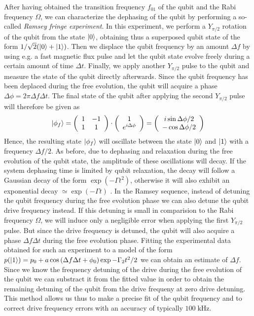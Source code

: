After having obtained the transition frequency $f_{01}$ of the qubit and the Rabi frequency $\Omega$, we can characterize the dephasing of the qubit by performing a so-called {\it Ramsey fringe experiment}\citep{}. In this experiment, we perform a $Y_{\pi/2}$ rotation of the qubit from the state $\left| 0 \right>$, obtaining thus a superposed qubit state of the form $1/\sqrt{2}(\left| 0 \right>+\left| 1 \right>)$. Then we displace the qubit frequency by an amount $\Delta f$ by using e.g. a fast magnetic flux pulse and let the qubit state evolve freely during a certain amount of time $\Delta t$. Finally, we apply another $Y_{\pi/2}$ pulse to the qubit and measure the state of the qubit directly afterwards. Since the qubit frequency has been deplaced during the free evolution, the qubit will acquire a phase $\Delta \phi = 2\pi\Delta f \Delta t$. The final state of the qubit after applying the second $Y_{\pi/2}$ pulse will therefore be given as
%
\begin{equation}
\left| \phi_f \right> = \left(\begin{array}{cc} 1 & -1 \\ 1 & 1 \end{array} \right)\cdot\left(\begin{array}{c} 1 \\ e^{i\Delta\phi} \end{array}\right) = \left( \begin{array}{c} i\sin{\Delta\phi/2} \\ -\cos{\Delta\phi/2}\end{array}\right)
\end{equation}
%
Hence, the resulting state $\left| \phi_f \right>$ will oscillate between the state $\left| 0 \right>$ and $\left| 1 \right>$ with a frequency $\Delta f/2$. As before, due to dephasing and relaxation during the free evolution of the qubit state, the amplitude of these oscillations will decay. If the system dephasing time is limited by qubit relaxation, the decay will follow a Gaussian decay of the form $\exp{(-\Gamma t^2)}$, otherwise it will also exhibit an exponential decay $\simeq \exp{(-\Gamma t)}$ \citep{}. In the Ramsey sequence, instead of detuning the qubit frequency during the free evolution phase we can also detune the qubit drive frequency instead. If this detuning is small in comparision to the Rabi frequency $\Omega$, we will induce only a negligible error when applying the first $Y_{\pi/2}$ pulse. But since the drive frequency is detuned, the qubit will also acquire a phase $\Delta f \Delta t$ during the free evolution phase. Fitting the experimental data obtained for such an experiment to a model of the form $p(\left| 1 \right>) = p_0 +a\cos{(\Delta f \Delta t+\phi_0)}\exp{-\Gamma_2 t^2/2}$ we can obtain an estimate of $\Delta f$. Since we know the frequency detuning of the drive during the free evolution of the qubit we can substract it from the fitted value in order to obtain the remaining detuning of the qubit from the drive frequeny at zero drive detuning. This method allows us thus to make a precise fit of the qubit frequency and to correct drive frequency errors with an accuracy of typically $100\;\mathrm{kHz}$. 

